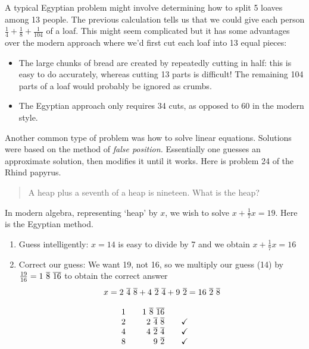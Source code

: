 A typical Egyptian problem might involve determining how to split 5 loaves among 13 people. The previous calculation tells us that we could give each person $\frac 14+\frac 18+\frac 1{104}$ of a loaf. This might seem complicated but it has some advantages over the modern approach where we'd first cut each loaf into 13 equal pieces:
\begin{itemize}
  \item The large chunks of bread are created by repeatedly cutting in half: this is easy to do accurately, whereas cutting 13\th{} parts is difficult! The remaining 104\th{} parts of a loaf would probably be ignored as crumbs.
  \item The Egyptian approach only requires 34 cuts, as opposed to 60 in the modern style.
\end{itemize}




Another common type of problem was how to solve linear equations. Solutions were based on the method of \emph{false position.} Essentially one guesses an approximate solution, then modifies it until it works. Here is problem 24 of the Rhind papyrus.
\begin{quote}
	A heap plus a seventh of a heap is nineteen. What is the heap?
\end{quote}
In modern algebra, representing `heap' by $x$, we wish to solve $x+\frac 17x=19$. Here is the Egyptian method.\par

\begin{minipage}[t]{0.69\linewidth}\vspace{0pt}
	\begin{enumerate}
  	\item Guess intelligently: $x=14$ is easy to divide by 7 and we obtain $x+\frac 17 x=16$
  	\item Correct our guess: We want 19, not 16, so we multiply our guess (14) by $\frac{19}{16}=1\ \cl 8\ \cl{16}$ to obtain the correct answer
  	\[
  		x=2\ \cl 4\ \cl 8 +4\ \cl 2\ \cl 4+ 9\ \cl 2 =16\ \cl 2\ \cl 8
  	\]
	\end{enumerate}
\end{minipage}
\hfill
\begin{minipage}[t]{0.3\linewidth}\vspace{0pt}
	\hfill 
	\[
		\begin{array}{r@{\qquad}r@{\qquad}c}
			1&1\ \cl 8\ \cl{16}\\
			2&2\ \cl 4\ \cl 8&\checkmark\\
			4&4\ \cl 2\ \cl 4&\checkmark\\
			8&9\ \cl 2&\checkmark
		\end{array}
	\]
\end{minipage}\medbreak


